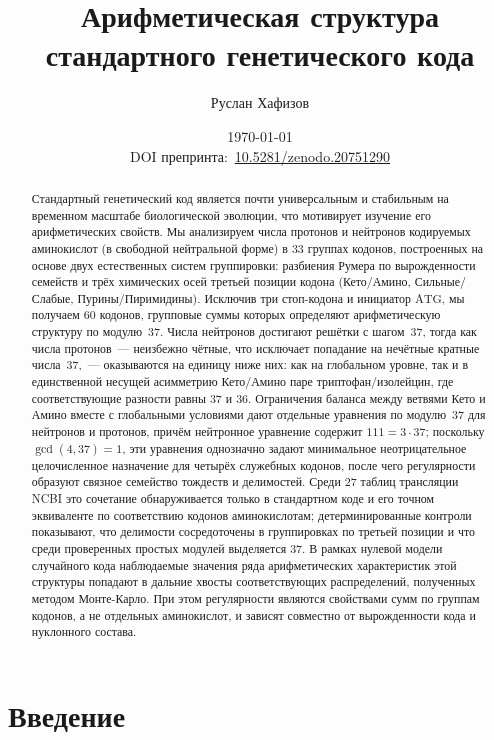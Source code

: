 \documentclass[11pt,a4paper]{article}
\title{Арифметическая структура стандартного генетического кода}
\author{Руслан Хафизов}
\date{\today\\[1ex]
\small DOI препринта:~\href{https://doi.org/10.5281/zenodo.20751290}{10.5281/zenodo.20751290}}
\renewcommand{\_}{\origunderscore\allowbreak}
\begin{document}
\maketitle

\begin{abstract}
Стандартный генетический код является почти
универсальным и стабильным на временном масштабе
биологической эволюции, что мотивирует
изучение его арифметических свойств. Мы анализируем числа протонов и нейтронов кодируемых аминокислот (в свободной нейтральной форме) в $33$ группах кодонов, построенных на основе двух естественных систем группировки: разбиения Румера по вырожденности семейств и трёх химических осей третьей позиции кодона (Кето/Амино, Сильные/Слабые, Пурины/Пиримидины). Исключив три
стоп-кодона и инициатор $\mathrm{ATG}$, мы получаем $60$
кодонов, групповые суммы которых определяют арифметическую
структуру по модулю~$37$. Числа нейтронов достигают решётки
с шагом~$37$, тогда как числа протонов~--- неизбежно чётные,
что исключает попадание на нечётные кратные числа~$37$,~---
оказываются на единицу ниже них: как на глобальном уровне,
так и в единственной несущей асимметрию Кето/Амино паре
триптофан/изолейцин, где соответствующие разности равны
$37$ и $36$. Ограничения баланса между ветвями Кето и Амино
вместе с глобальными условиями дают отдельные уравнения
по модулю~$37$ для нейтронов и протонов, причём нейтронное
уравнение содержит $111 = 3 \cdot 37$; поскольку
$\gcd(4, 37) = 1$, эти уравнения однозначно задают
минимальное неотрицательное целочисленное назначение для
четырёх служебных кодонов, после чего регулярности образуют
связное семейство тождеств и делимостей. Среди $27$ таблиц
трансляции NCBI это сочетание обнаруживается только в
стандартном коде и его точном эквиваленте по соответствию
кодонов аминокислотам; детерминированные контроли
показывают, что делимости сосредоточены в группировках по
третьей позиции и что среди проверенных простых модулей
выделяется $37$. В рамках нулевой модели случайного кода наблюдаемые значения ряда арифметических характеристик этой структуры попадают в дальние хвосты соответствующих распределений, полученных методом Монте-Карло. При этом регулярности являются свойствами сумм
по группам кодонов, а не отдельных аминокислот, и зависят
совместно от вырожденности кода и нуклонного состава.
\end{abstract}

\tableofcontents

\section{Введение}
\label{sec:introduction}
\end{document}

